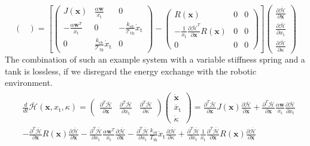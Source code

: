 \documentclass[a4paper,twoside, openright,12pt]{report}
\newcommand{\f}[1]{\boldsymbol{#1}}
\newcommand{\g}[1]{\text{#1}}
\begin{document}
{\begin{equation}
\begin{pmatrix}
\end{pmatrix} =
\left[
\begin{pmatrix}
J(\f{x}) & \frac{\alpha \f{w}}{x_\g{t}} & 0\\ -\frac{\alpha \f{w}^T}{x_\g{t}} & 0 & -\frac{k_{vb}}{\mathcal{T}_{\g{th}}}\dot{x}_\g{t} \\ 0 & \frac{k_{vb}}{\mathcal{T}_{\g{th}}}\dot{x}_\g{t} & 0\end{pmatrix}
- 
\begin{pmatrix}
R(\f{x}) & 0 & 0\\ -\frac{1}{x_\g{t}}\frac{\partial \bar{\mathcal{H}}^T}{\partial \f{x}}R(\f{x}) & 0 & 0 \\ 0 & 0 & 0
\end{pmatrix}
\right]
\begin{pmatrix}
\frac{\partial \bar{\mathcal{H}}}{\partial \f{x}} \\
\frac{\partial \bar{\mathcal{H}}}{\partial x_\g{t}} \\
\frac{\partial \bar{\mathcal{H}}}{\partial \kappa} 
\end{pmatrix}
\end{equation}
The combination of such an example system with a variable stiffness spring and a tank is lossless, if we disregard the energy exchange with the robotic environment.
\begin{eqnarray}
\begin{aligned}
&\frac{d}{dt}\bar{\mathcal{H}}(\f{x},x_\g{t},\kappa) = 
\begin{pmatrix}
\frac{\partial^T \bar{\mathcal{H}}}{\partial \f{x}} & \frac{\partial^T \bar{\mathcal{H}}}{\partial x_\g{t}} &
\frac{\partial^T \bar{\mathcal{H}}}{\partial \kappa}
\end{pmatrix}
\begin{pmatrix}
\dot{\f{x}} \\ \dot{x_\g{t}} \\ \dot{\kappa}
\end{pmatrix}
= \frac{\partial^T \bar{\mathcal{H}}}{\partial \f{x}}J(\f{x})\frac{\partial \bar{\mathcal{H}}}{\partial \f{x}} + \frac{\partial^T \bar{\mathcal{H}}}{\partial \f{x}}\frac{\alpha \f{w}}{x_\g{t}}\frac{\partial \bar{\mathcal{H}}}{\partial x_\g{t}} 
\\
&-\frac{\partial^T \bar{\mathcal{H}}}{\partial \f{x}}R(\f{x})\frac{\partial \bar{\mathcal{H}}}{\partial \f{x}} -\frac{\partial^T \bar{\mathcal{H}}}{\partial x_\g{t}}\frac{\alpha \f{w}^T}{x_\g{t}} \frac{\partial \bar{\mathcal{H}}}{\partial \f{x}} - \frac{\partial^T \bar{\mathcal{H}}}{\partial x_\g{t}}\frac{k_{vb}}{T_{\g{th}}}\dot{x}_\g{t} \frac{\partial \bar{\mathcal{H}}}{\partial \kappa}   + \frac{\partial^T \bar{\mathcal{H}}}{\partial x_\g{t}}\frac{1}{x_\g{t}}\frac{\partial^T \bar{\mathcal{H}}}{\partial \f{x}}R(\f{x})\frac{\partial \bar{\mathcal{H}}}{\partial \f{x}} 

\end{aligned}
\end{eqnarray}}
\end{document}
